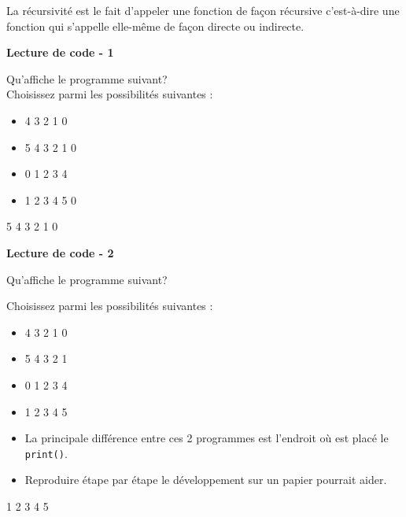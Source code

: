     La récursivité est le fait d'appeler une fonction de façon récursive c'est-à-dire une fonction qui s'appelle elle-même de façon directe ou indirecte. \\
    
	\begin{Exercice}[5 minutes] \textbf{Lecture de code - 1} 
	
	Qu'affiche le programme suivant? \\ 
	
	 
	
	Choisissez parmi les possibilités suivantes : \\
	
	\begin{itemize}
	\item 4  
	3 
	2 
	1 
	0 
	\item 5 
	4 
	3 
	2 
    1 
    0
	\item 0 
	1 
	2 
	3 
	4 
	\item 1 
	2 
	3 
	4
    5
    0
    \end{itemize}
    \begin{solution} 
			5  
			4  
			3  
			2  
			1  
			0  
		\end{solution} 
    
\end{Exercice}

\begin{Exercice}[5 minutes] \textbf{Lecture de code - 2}
    
	Qu'affiche le programme suivant?
	
	
	Choisissez parmi les possibilités suivantes : \\
	
	\begin{itemize}
	\item 4  
	3 
	2 
	1 
	0 
	\item 5 
	4 
	3 
	2 
	1 
	\item 0 
	1 
	2 
	3 
	4 
	\item 1 
	2 
	3 
	4 
	5
	\end{itemize}
	
	 
	
		\begin{conseil} 
		\begin{itemize} 
			\item La principale différence entre ces 2 programmes est l'endroit où est placé le \lstinline{print()}. 
			\item Reproduire étape par étape le développement sur un papier pourrait aider. 
		\end{itemize} 
		\end{conseil} 
	
		\begin{solution}  
			1  
			2  
			3  
			4  
			5 
	
		\end{solution} 
	
	\end{Exercice}
	
